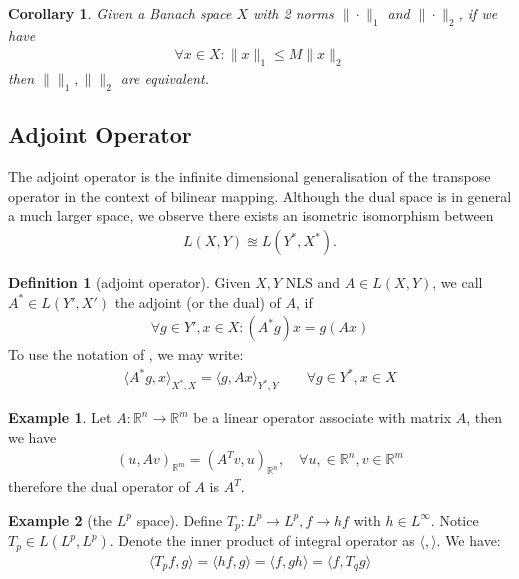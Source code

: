 \documentclass[a4paper,11pt,fleqn]{book}
\newtheorem{corollary}{Corollary}[theorem]
\theoremstyle{definition}
\newtheorem{definition}{Definition}[section]
\newtheorem*{example}{Example}
\theoremstyle{remark}
\begin{document}
\begin{corollary}
	Given a Banach space $X$ with 2 norms $\|\cdot\|_1$ and $\|\cdot\|_2$, if we have
	\begin{align*}
		\forall x \in X: \|x\|_1 \le M \|x\|_2
	\end{align*}
	then $\|\|_1, \|\|_2$ are equivalent.
\end{corollary}




 

\subsection{Adjoint Operator}
The adjoint operator is the infinite dimensional generalisation of the transpose operator in the context of bilinear mapping. Although the dual space is in general a much larger space, we observe there exists an isometric isomorphism between 
\begin{align*}
	L(X, Y) \approxeq L(Y^*, X^*). 
\end{align*}
\begin{definition}[adjoint operator]
	Given $X, Y$ NLS and $A \in L(X,Y)$, we call $A^* \in L(Y', X') $ the adjoint (or the dual) of $A$, if
	\begin{align*}
		\forall g \in Y', x \in X: (A^*g)x = g(Ax)
	\end{align*}
	To use the notation of , we may write:
	\begin{align*}
		\langle A^*g, x\rangle_{X^*,X} = \langle g, Ax\rangle_{Y^*, Y} \qquad \forall g \in Y^*, x \in X
	\end{align*}
\end{definition}

\begin{example}
Let $A: \mathbb{R}^n \rightarrow \mathbb{R}^m$ be a linear operator associate with matrix $A$, then we have
\begin{align*}
	(u, Av)_{\mathbb{R}^m} = (A^Tv, u)_{\mathbb{R}^n},\quad \forall u, \in \mathbb{R}^n, v \in \mathbb{R}^m
\end{align*}	
therefore the dual operator of $A$ is $A^T$. 
\end{example}


\begin{example}[the $L^p$ space]
	Define $T_p: L^p \rightarrow L^p, f \rightarrow hf$ with $h \in L^\infty$. Notice $T_p \in L(L^p, L^p)$. Denote the inner product of integral operator as $\langle, \rangle$. We have:
	\begin{align*}
		\langle T_pf, g\rangle = \langle hf, g\rangle = \langle f, gh\rangle = \langle f, T_qg\rangle
	\end{align*}
\end{example}
\end{document}
